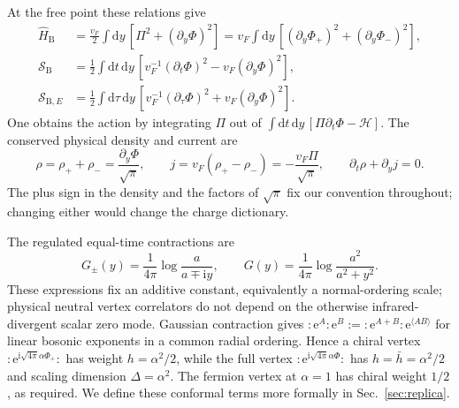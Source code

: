 \documentclass[aps,prb,onecolumn,nofootinbib,superscriptaddress]{revtex4-2}
\newcommand{\dd}{\mathrm{d}}
\newcommand{\ii}{\mathrm{i}}
\newcommand{\e}{\mathrm{e}}
\begin{document}
At the free point these relations give
\begin{align}
 \hat H_{\mathrm B}
 &=\frac{v_F}{2}\int\dd y\,[\Pi^2+(\partial_y\Phi)^2]
 =v_F\int\dd y\,[(\partial_y\Phi_+)^2+(\partial_y\Phi_-)^2],
 \label{eq:free-boson-hamiltonian}\\
 \mathcal S_{\mathrm B}
 &=\frac12\int\dd t\,\dd y\,
       [v_F^{-1}(\partial_t\Phi)^2-v_F(\partial_y\Phi)^2],
 \label{eq:free-boson-action}\\
 \mathcal S_{\mathrm B,E}
 &=\frac12\int\dd\tau\,\dd y\,
       [v_F^{-1}(\partial_\tau\Phi)^2+v_F(\partial_y\Phi)^2].
 \label{eq:free-boson-euclidean}
\end{align}
One obtains the action by integrating $\Pi$ out of
$\int\dd t\,\dd y\,[\Pi\partial_t\Phi-\mathcal H]$.
The conserved physical density and current are
\begin{equation}
 \rho=\rho_++\rho_-=\frac{\partial_y\Phi}{\sqrt\pi},\qquad
 j=v_F(\rho_+-\rho_-)=-\frac{v_F\Pi}{\sqrt\pi},\qquad
 \partial_t\rho+\partial_yj=0.
 \label{eq:user-charge-current}
\end{equation}
The plus sign in the density and the factors of $\sqrt\pi$ fix our
convention throughout; changing either would change the charge dictionary.

The regulated equal-time contractions are
\begin{equation}
 G_\pm(y)=\frac{1}{4\pi}\log\frac{a}{a\mp\ii y},\qquad
 G(y)=\frac{1}{4\pi}\log\frac{a^2}{a^2+y^2}.
 \label{eq:user-boson-propagators}
\end{equation}
These expressions fix an additive constant, equivalently a normal-ordering
scale; physical neutral vertex correlators do not depend on the otherwise
infrared-divergent scalar zero mode. Gaussian contraction gives
$:\!\e^A\!:\!\e^B\!:=:\!\e^{A+B}\!:\e^{\langle AB\rangle}$
for linear bosonic exponents in a common radial ordering. Hence a chiral
vertex $:\!\e^{\ii\sqrt{4\pi}\alpha\Phi_+}\!:$ has weight
$h=\alpha^2/2$, while the full vertex
$:\!\e^{\ii\sqrt{4\pi}\alpha\Phi}\!:$ has
$h=\bar h=\alpha^2/2$ and scaling dimension $\Delta=\alpha^2$.
The fermion vertex at $\alpha=1$ has chiral weight $1/2$, as required.
We define these conformal terms more formally in Sec.~\ref{sec:replica}.
\end{document}
